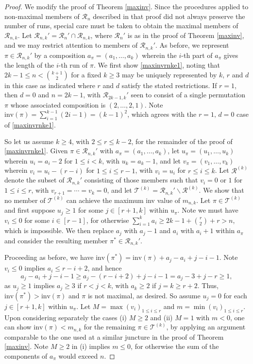 \documentclass[10pt,a4paper]{amsart}
\theoremstyle{plain}
\begin{document}
\begin{proof}
We modify the proof of Theorem \ref{maxinv}.  Since the procedures applied to non-maximal members of $\mathcal{R}_n$ described in that proof did not always preserve the number of runs, special care must be taken to obtain the maximal members of $\mathcal{R}_{n,k}$.  Let $\mathcal{R}_{n,k}'=\mathcal{R}_n'\cap \mathcal{R}_{n,k}$, where $\mathcal{R}_{n}'$ is as in the proof of Theorem \ref{maxinv}, and we may restrict attention to members of $\mathcal{R}_{n,k}'$.  As before, we represent $\pi \in \mathcal{R}_{n,k}'$ by a composition $a_\pi=(a_1,\ldots,a_k)$ wherein the $i$-th part of $a_\pi$ gives the length of the $i$-th run of $\pi$.  We first show \eqref{maxinvrnke1}, noting that $2k-1 \leq n <\binom{k+1}{2}$ for a fixed $k \geq 3$ may be uniquely represented by $k$, $r$ and $d$ in this case as indicated where $r$ and $d$ satisfy the stated restrictions.  If $r=1$, then $d=0$ and $n=2k-1$, with  $\mathcal{R}_{2k-1,k}'$ seen to consist of a single permutation $\pi$ whose associated composition is $(2,\ldots,2,1)$.  Note $\text{inv}(\pi)=\sum_{i=1}^{k-1}(2i-1)=(k-1)^2$, which agrees with the $r=1,\,d=0$ case of \eqref{maxinvrnke1}.

So let us assume $k \geq 4$, with $2 \leq r \leq k-2$, for the remainder of the proof of \eqref{maxinvrnke1}. Given $\pi \in \mathcal{R}_{n,k}'$ with $a_\pi=(a_1,\ldots,a_k)$, let $u_\pi=(u_1,\ldots,u_k)$ wherein $u_i=a_i-2$ for $1 \leq i < k$, with $u_k=a_k-1$, and let $v_\pi=(v_1,\ldots,v_k)$ wherein $v_i=u_i-(r-i)$ for $1 \leq i \leq r-1$, with $v_i=u_i$ for $r \leq i \leq k$.  Let $\mathcal{R}^{(k)}$ denote the subset of $\mathcal{R}_{n,k}'$ consisting of those members such that $v_i=0$ or $1$ for $1 \leq i \leq r$, with $v_{r+1}=\cdots=v_k=0$, and let $\mathcal{T}^{(k)}=\mathcal{R}_{n,k}'\backslash \mathcal{R}^{(k)}$.  We show that no member of $\mathcal{T}^{(k)}$ can achieve the maximum inv value of $m_{n,k}$. Let $\pi \in \mathcal{T}^{(k)}$ and first suppose $u_j \geq 1$ for some $j \in [r+1,k]$ within $u_\pi$.  Note we must have $v_i \leq 0$ for some $i \in [r-1]$, for otherwise
$\sum_{i=1}^ka_i \geq 2k-1+\binom{r}{2}+r>n$, which is impossible.  We then replace $a_j$ with $a_j-1$ and $a_i$ with $a_i+1$ within $a_\pi$ and consider the resulting member $\pi^* \in \mathcal{R}_{n,k}'$.

Proceeding as before, we have $\text{inv}(\pi^*)=\text{inv}(\pi)+a_j-a_i+j-i-1$.  Note $v_i \leq 0$ implies $a_i \leq r-i+2$, and hence
$$a_j-a_i+j-i-1 \geq a_j-(r-i+2)+j-i-1=a_j-3+j-r \geq 1,$$
as $u_j \geq 1$ implies $a_j \geq 3$ if $r<j<k$, with $a_k \geq 2$ if $j=k \geq r+2$.  Thus, $\text{inv}(\pi^*)>\text{inv}(\pi)$ and $\pi$ is not maximal, as desired.  So assume $u_j=0$ for each $j \in [r+1,k]$ within $u_\pi$.  Let $M=\max(v_i)_{1 \leq i \leq r}$ and $m=\min(v_i)_{1 \leq i \leq r}$.   Upon considering separately the cases (i) $M \geq 2$ and (ii) $M=1$ with $m<0$, one can show $\text{inv}(\pi)<m_{n,k}$ for the remaining $\pi \in \mathcal{T}^{(k)}$, by applying an argument comparable to the one used at a similar juncture in the proof of Theorem \ref{maxinv}.  Note $M \geq 2$ in (i) implies $m \leq 0$, for otherwise the sum of the components of $a_\pi$ would exceed $n$.


\end{proof}
\end{document}
